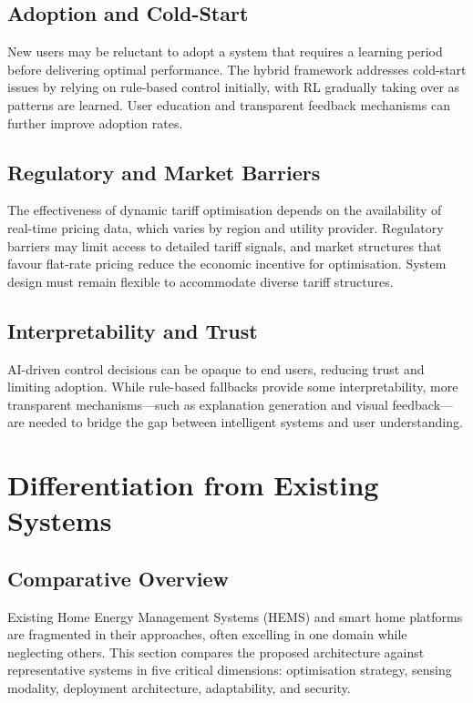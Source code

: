 \documentclass[11pt,a4paper]{article}
\begin{document}
\subsection{Adoption and Cold-Start}

New users may be reluctant to adopt a system that requires a learning period before delivering optimal performance. The hybrid framework addresses cold-start issues by relying on rule-based control initially, with RL gradually taking over as patterns are learned. User education and transparent feedback mechanisms can further improve adoption rates.

\subsection{Regulatory and Market Barriers}

The effectiveness of dynamic tariff optimisation depends on the availability of real-time pricing data, which varies by region and utility provider. Regulatory barriers may limit access to detailed tariff signals, and market structures that favour flat-rate pricing reduce the economic incentive for optimisation. System design must remain flexible to accommodate diverse tariff structures.

\subsection{Interpretability and Trust}

AI-driven control decisions can be opaque to end users, reducing trust and limiting adoption. While rule-based fallbacks provide some interpretability, more transparent mechanisms---such as explanation generation and visual feedback---are needed to bridge the gap between intelligent systems and user understanding.

\section{Differentiation from Existing Systems}

\subsection{Comparative Overview}

Existing Home Energy Management Systems (HEMS) and smart home platforms are fragmented in their approaches, often excelling in one domain while neglecting others. This section compares the proposed architecture against representative systems in five critical dimensions: optimisation strategy, sensing modality, deployment architecture, adaptability, and security.
\end{document}
